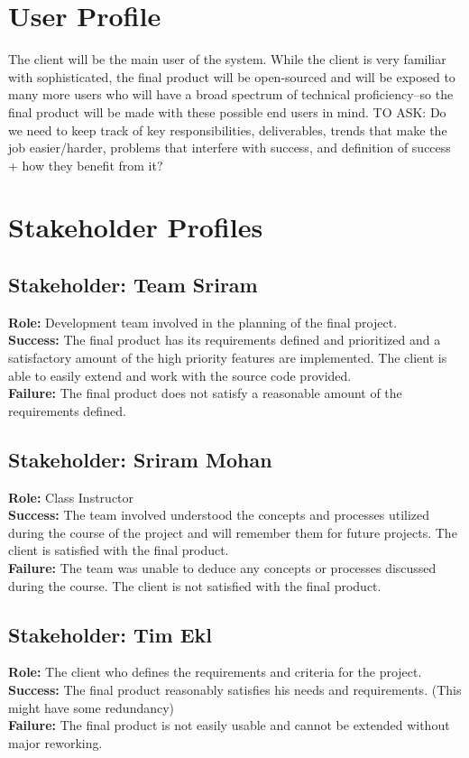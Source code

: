 \documentclass{article}
\begin{document}
\section{User Profile}
The client will be the main user of the system.  While the client is very familiar with sophisticated, the final product will be open-sourced and will be exposed to many more users who will have a broad spectrum of technical proficiency--so the final product will be made with these possible end users in mind.
TO ASK: Do we need to keep track of key responsibilities, deliverables, trends that make the job easier/harder, problems that interfere with success, and definition of success + how they benefit from it?

\section{Stakeholder Profiles}

\subsection{Stakeholder: Team Sriram}
\textbf{Role:} Development team involved in the planning of the final project.\\
\textbf{Success:} The final product has its requirements defined and prioritized and a satisfactory amount of the high priority features are implemented.  The client is able to easily extend and work with the source code provided.\\
\textbf{Failure:} The final product does not satisfy a reasonable amount of the requirements defined.

\subsection{Stakeholder: Sriram Mohan}
\textbf{Role:} Class Instructor\\
\textbf{Success:} The team involved understood the concepts and processes utilized during the course of the project and will remember them for future projects. The client is satisfied with the final product.\\
\textbf{Failure:} The team was unable to deduce any concepts or processes discussed during the course. The client is not satisfied with the final product.

\subsection{Stakeholder: Tim Ekl}
\textbf{Role:} The client who defines the requirements and criteria for the project.\\
\textbf{Success:} The final product reasonably satisfies his needs and requirements. (This might have some redundancy)\\
\textbf{Failure:} The final product is not easily usable and cannot be extended without major reworking.
\end{document}
